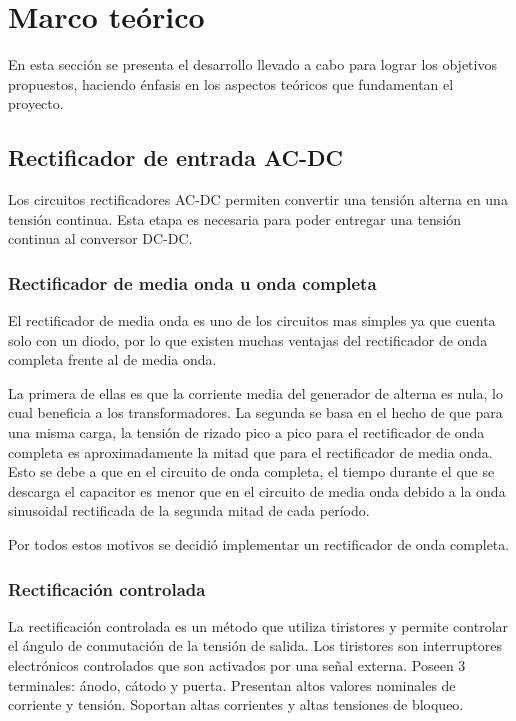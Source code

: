 \section{Marco teórico}

En esta sección se presenta el desarrollo llevado a cabo para lograr los objetivos propuestos, haciendo énfasis en los aspectos teóricos que fundamentan el proyecto.

\subsection{Rectificador de entrada AC-DC}
Los circuitos rectificadores AC-DC permiten convertir una tensión alterna en una tensión continua.
Esta etapa es necesaria para poder entregar una tensión continua al conversor DC-DC.

\subsubsection{Rectificador de media onda u onda completa}

El rectificador de media onda es uno de los circuitos mas simples ya que cuenta solo con un diodo,
por lo que existen muchas ventajas del rectificador de onda completa frente al de media onda.

La primera de ellas es que la corriente media del generador de alterna es nula, lo cual beneficia a los transformadores. 
La segunda se basa en el hecho de que para una misma carga,
la tensión de rizado pico a pico para el rectificador de onda completa es
aproximadamente la mitad que para el rectificador de media onda. 
Esto se debe a que en el circuito de onda completa,
el tiempo durante el que se descarga el capacitor es menor que en el circuito de media onda %
debido a la onda sinusoidal rectificada de la segunda mitad de cada período. 

Por todos estos motivos se decidió implementar un rectificador de onda completa.

\subsubsection{Rectificación controlada}

La rectificación controlada es un método que utiliza tiristores y permite controlar el ángulo de conmutación de la tensión de salida.
Los tiristores son interruptores electrónicos controlados que son activados por una señal externa. 
Poseen 3 terminales: ánodo, cátodo y puerta. Presentan altos valores nominales de corriente y tensión.
Soportan altas corrientes y altas tensiones de bloqueo. 

